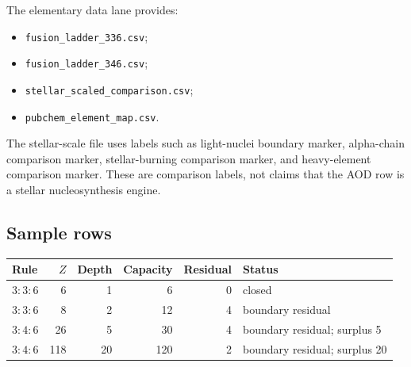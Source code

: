The elementary data lane provides:
\begin{itemize}[leftmargin=2em]
  \item \texttt{fusion\_ladder\_336.csv};
  \item \texttt{fusion\_ladder\_346.csv};
  \item \texttt{stellar\_scaled\_comparison.csv};
  \item \texttt{pubchem\_element\_map.csv}.
\end{itemize}
The stellar-scale file uses labels such as light-nuclei boundary marker, alpha-chain comparison marker, stellar-burning comparison marker, and heavy-element comparison marker. These are comparison labels, not claims that the AOD row is a stellar nucleosynthesis engine.

\subsection{Sample rows}

\begin{center}
\begin{tabularx}{\linewidth}{@{}lrrrrX@{}}
\toprule
Rule & $Z$ & Depth & Capacity & Residual & Status \\
\midrule
$3{:}3{:}6$ & 6 & 1 & 6 & 0 & closed \\
$3{:}3{:}6$ & 8 & 2 & 12 & 4 & boundary residual \\
$3{:}4{:}6$ & 26 & 5 & 30 & 4 & boundary residual; surplus 5 \\
$3{:}4{:}6$ & 118 & 20 & 120 & 2 & boundary residual; surplus 20 \\
\bottomrule
\end{tabularx}
\end{center}
